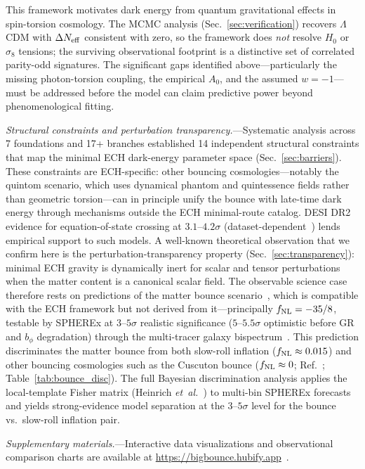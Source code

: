 \documentclass[aps,prd,twocolumn,superscriptaddress,showpacs,preprintnumbers,nofootinbib,longbibliography,floatfix]{revtex4-2}
\newcommand{\Neff}{N_{\rm eff}}
\newcommand{\etal}{\textit{et~al.}}
\newcommand{\fnl}{f_{\rm NL}}
\begin{document}
This framework motivates dark energy from quantum gravitational effects in spin-torsion cosmology. The MCMC analysis (Sec.~\ref{sec:verification}) recovers $\Lambda$CDM with $\Delta\Neff$ consistent with zero, so the framework does \emph{not} resolve $H_0$ or $\sigma_8$ tensions; the surviving observational footprint is a distinctive set of correlated parity-odd signatures. The significant gaps identified above---particularly the missing photon-torsion coupling, the empirical $A_0$, and the assumed $w=-1$---must be addressed before the model can claim predictive power beyond phenomenological fitting.

\textit{Structural constraints and perturbation transparency.}---Systematic analysis across 7 foundations and 17+ branches established 14 independent structural constraints that map the minimal ECH dark-energy parameter space (Sec.~\ref{sec:barriers}). These constraints are ECH-specific: other bouncing cosmologies---notably the quintom scenario, which uses dynamical phantom and quintessence fields rather than geometric torsion---can in principle unify the bounce with late-time dark energy through mechanisms outside the ECH minimal-route catalog. DESI DR2 evidence for equation-of-state crossing at $3.1$--$4.2\sigma$ (dataset-dependent~\cite{DESI2025DR2}) lends empirical support to such models. A well-known theoretical observation that we confirm here is the perturbation-transparency property (Sec.~\ref{sec:transparency}): minimal ECH gravity is dynamically inert for scalar and tensor perturbations when the matter content is a canonical scalar field. The observable science case therefore rests on predictions of the matter bounce scenario~\cite{Cai:2009fn}, which is compatible with the ECH framework but not derived from it---principally $\fnl = -35/8$, testable by SPHEREx at $3$--$5\sigma$ realistic significance ($5$--$5.5\sigma$ optimistic before GR and $b_\phi$ degradation) through the multi-tracer galaxy bispectrum~\cite{Heinrich:2023}. This prediction discriminates the matter bounce from both slow-roll inflation ($\fnl \approx 0.015$) and other bouncing cosmologies such as the Cuscuton bounce ($\fnl \approx 0$; Ref.~\cite{Dehghani:2025cusc}; Table~\ref{tab:bounce_disc}). The full Bayesian discrimination analysis applies the local-template Fisher matrix (Heinrich \etal~\cite{Heinrich:2023}) to multi-bin SPHEREx forecasts and yields strong-evidence model separation at the $3$--$5\sigma$ level for the bounce vs.\ slow-roll inflation pair.

\textit{Supplementary materials.}---Interactive data visualizations and observational comparison charts are available at \url{https://bigbounce.hubify.app}~\cite{BigBounceWebsite}.
\end{document}
